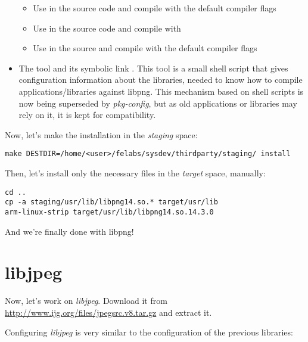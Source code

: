 \begin{itemize}
  \begin{itemize}

  \item Use  in the source code and compile with
    the default compiler flags

  \item Use  in the source code and compile
    with 

  \item Use  in the source and compile
    with the default compiler flags

  \end{itemize}

\item The  tool and its symbolic link
  . This tool is a small shell script
  that gives configuration information about the libraries, needed to
  know how to compile applications/libraries against libpng. This
  mechanism based on shell scripts is now being superseded by {\em
    pkg-config}, but as old applications or libraries may rely on it,
  it is kept for compatibility.

\end{itemize}

Now, let's make the installation in the {\em staging} space:

\begin{verbatim}
make DESTDIR=/home/<user>/felabs/sysdev/thirdparty/staging/ install
\end{verbatim}

Then, let's install only the necessary files in the {\em target}
space, manually:

\begin{verbatim}
cd ..
cp -a staging/usr/lib/libpng14.so.* target/usr/lib
arm-linux-strip target/usr/lib/libpng14.so.14.3.0
\end{verbatim}

And we're finally done with libpng!

\section{libjpeg}

Now, let's work on {\em libjpeg}. Download it from
\url{http://www.ijg.org/files/jpegsrc.v8.tar.gz} and extract it.

Configuring {\em libjpeg} is very similar to the configuration of the
previous libraries:

